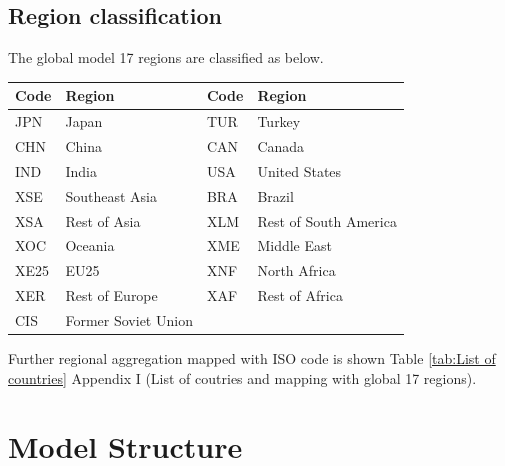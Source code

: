 \documentclass[10pt,a4paper,titlepage,dvipdfmx]{book}
\begin{document}
\section{\label{sec:RegClass}Region classification}

The global model 17 regions are classified as below. 


\begin{tabularx}{\textwidth}{|
p{}|
p{}|
p{}|
p{}|} 
\caption{\label{tab:Reg} List of regions}\\
\hline 
Code & Region & Code & Region \\\hline 
JPN & Japan & TUR & Turkey \\\hline 
CHN & China & CAN & Canada \\\hline 
IND & India & USA & United States \\\hline 
XSE & Southeast Asia & BRA & Brazil \\\hline 
XSA & Rest of Asia & XLM & Rest of South America \\\hline 
XOC & Oceania & XME & Middle East \\\hline 
XE25 & EU25 & XNF & North Africa \\\hline 
XER & Rest of Europe & XAF & Rest of Africa \\\hline 
CIS & Former Soviet Union &   &   \\\hline 
\end{tabularx}



Further regional aggregation mapped with ISO code is shown Table \ref{tab:List of countries} Appendix I (List of coutries and mapping with global 17 regions).

\chapter{\label{chp:ModelStr}Model Structure}
\end{document}
